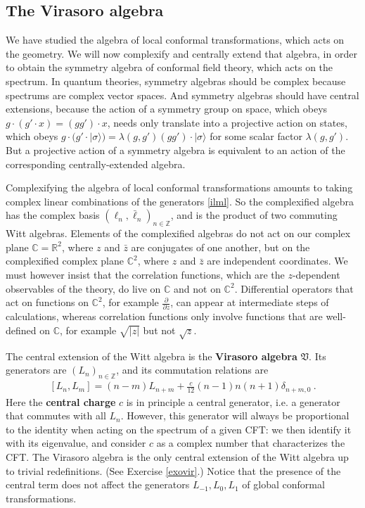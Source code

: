 \documentclass[12pt, a4paper, notitlepage, twoside]{report}
\numberwithin{equation}{section}
\theoremstyle{break}
\begin{document}
\subsection{The Virasoro algebra \label{secvir}}

We have studied the algebra of local conformal transformations, which acts on the geometry. 
We will now complexify and centrally extend that algebra, in order to obtain the symmetry algebra of conformal field theory, which acts on the spectrum. 
In quantum theories, symmetry algebras should be complex because spectrums are complex vector spaces. And symmetry algebras should have central extensions, because the action of a symmetry group on space, which obeys $g\cdot(g'\cdot x) = (gg')\cdot x$, needs only translate into a projective action on states, which obeys $g\cdot(g'\cdot|\sigma\rangle) = \lambda(g,g') (gg')\cdot |\sigma\rangle$ for some scalar factor $\lambda(g,g')$. 
But a projective action of a symmetry algebra is equivalent to an action of the corresponding centrally-extended algebra. 

Complexifying the algebra of local conformal transformations amounts to taking complex linear combinations of the generators \eqref{ilml}. So the complexified algebra has the complex basis $(\ell_n,\bar\ell_n)_{n\in\mathbb{Z}}$, and is the product of two commuting Witt algebras. Elements of the complexified algebras do not act on our complex plane $\mathbb{C}=\mathbb{R}^2$, where $z$ and $\bar z$ are conjugates of one another, but on the complexified complex plane ${\mathbb{C}}^2$, where $z$ and $\bar z$ are independent coordinates. 
We must however insist that the correlation functions, which are the $z$-dependent observables of the theory, do live on $\mathbb{C}$ and not on ${\mathbb{C}}^2$.
Differential operators that act on functions on ${\mathbb{C}}^2$, for example $\frac{\partial}{\partial z}$, can appear at intermediate steps of calculations, whereas correlation functions only involve functions that are well-defined on $\mathbb{C}$, for example $\sqrt{|z|}$ but not $\sqrt{z}$. 

The central extension of the Witt algebra is the 
\textbf{\boldmath Virasoro algebra} $\mathfrak{V}$.
Its generators are $(L_n)_{n\in {\mathbb{Z}}}$, and its commutation relations are 
\begin{align}
 \boxed{[L_n,L_m]=(n-m)L_{n+m} + \frac{c}{12} (n-1)n(n+1) \delta_{n+m,0}}\ .
\label{vir}
\end{align}
Here the \textbf{\boldmath central charge} $c$ is in principle a central generator, i.e. a generator that commutes with all $L_n$. However, this generator will always be proportional to the identity when acting on the spectrum of a given CFT: we then identify it with its eigenvalue, and consider $c$ as a complex number that characterizes the CFT. 
The Virasoro algebra is the only central extension of the Witt algebra up to trivial redefinitions. (See Exercise \ref{exovir}.) Notice that the presence of the central term does not affect the generators $L_{-1},L_0,L_1$ of global conformal transformations. 
\end{document}
